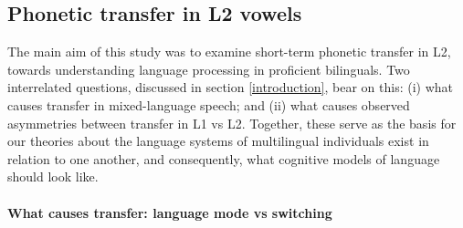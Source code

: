 \documentclass[12 pt]{article}
\begin{document}
\subsection{Phonetic transfer in L2 vowels}

The main aim of this study was to examine short-term phonetic transfer in L2, towards understanding language processing in proficient bilinguals. Two interrelated questions, discussed in section \ref{introduction}, bear on this: (i) what causes transfer in mixed-language speech; and (ii) what causes observed asymmetries between transfer in L1 vs L2. Together, these serve as the basis for our theories about the language systems of multilingual individuals exist in relation to one another, and consequently, what cognitive models of language should look like. 

\paragraph{\textbf{What causes transfer: language mode vs switching}}
\end{document}
